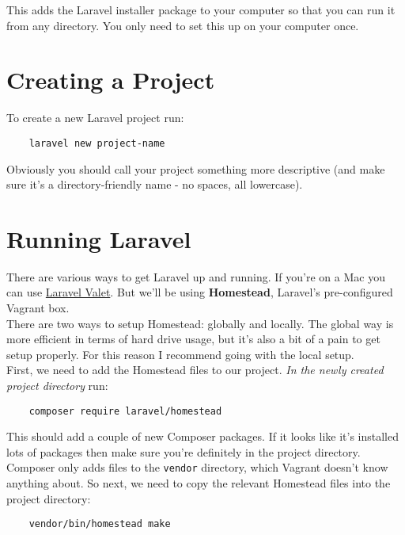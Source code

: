 This adds the Laravel installer package to your computer so that you can run it from any directory. You only need to set this up on your computer once.


\section{Creating a Project}

To create a new Laravel project run:

\begin{verbatim}
    laravel new project-name
\end{verbatim}

Obviously you should call your project something more descriptive (and make sure it's a directory-friendly name - no spaces, all lowercase).

\section{Running Laravel}

There are various ways to get Laravel up and running. If you're on a Mac you can use \href{https://laravel.com/docs/master/valet}{Laravel Valet}. But we'll be using \textbf{Homestead}, Laravel's pre-configured Vagrant box.
\\

There are two ways to setup Homestead: globally and locally. The global way is more efficient in terms of hard drive usage, but it's also a bit of a pain to get setup properly. For this reason I recommend going with the local setup.
\\

First, we need to add the Homestead files to our project. \textit{In the newly created project directory} run:

\begin{verbatim}
    composer require laravel/homestead
\end{verbatim}

This should add a couple of new Composer packages. If it looks like it's installed lots of packages then make sure you're definitely in the project directory.
\\

Composer only adds files to the \texttt{vendor} directory, which Vagrant doesn't know anything about. So next, we need to copy the relevant Homestead files into the project directory:

\begin{verbatim}
    vendor/bin/homestead make
\end{verbatim}

